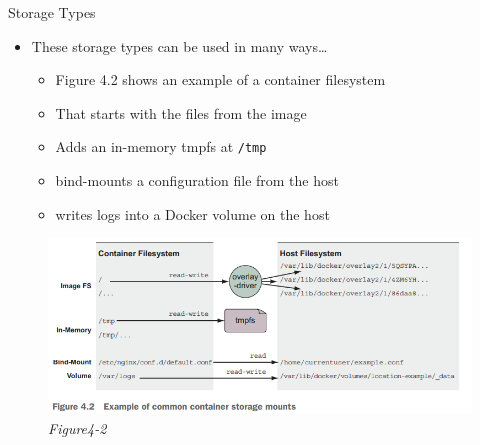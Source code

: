 \documentclass[ignorenonframetext,]{beamer}
\providecommand{\tightlist}{%
  \setlength{\itemsep}{0pt}\setlength{\parskip}{0pt}}
\begin{document}
\begin{frame}[fragile]{Storage Types}
\protect\hypertarget{storage-types}{}

\begin{itemize}
\tightlist
\item
  These storage types can be used in many ways\ldots{}

  \begin{itemize}
  \tightlist
  \item
    Figure 4.2 shows an example of a container filesystem
  \item
    That starts with the files from the image
  \item
    Adds an in-memory tmpfs at \texttt{/tmp}
  \item
    bind-mounts a configuration file from the host
  \item
    writes logs into a Docker volume on the host
  \end{itemize}
\end{itemize}

\begin{figure}
\centering
\includegraphics{./tex2pdf.-d218b5bed17bed47/cd97a05bfb8fd7d5b9ad2db9ae9c2a165575b964.png}
\caption{\emph{Figure4-2}}
\end{figure}

\end{frame}
\end{document}
